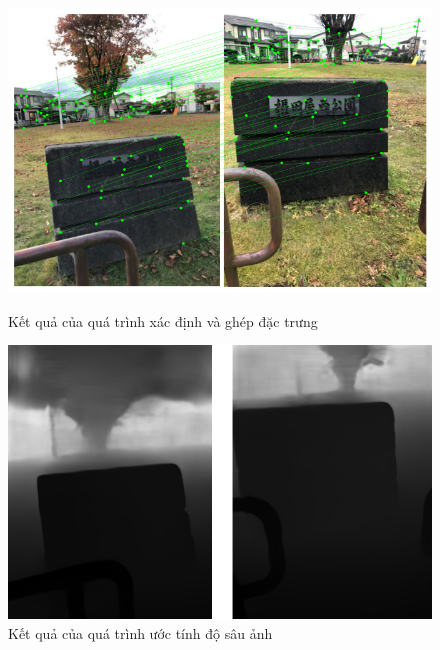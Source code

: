 \begin{figure}[H]
  \centering
  \begin{minipage}[b]{0.48\textwidth}
      \captionsetup{justification=centering}
      \includegraphics[width=\textwidth]{pics/Proposal/matching.png}
      \caption{Kết quả của quá trình xác định và ghép đặc trưng}
  \end{minipage}
  \begin{minipage}[b]{0.48\textwidth}
      \captionsetup{justification=centering}
      \includegraphics[width=\textwidth]{pics/Proposal/depth.png}
      \caption{Kết quả của quá trình ước tính độ sâu ảnh}
  \end{minipage}
\end{figure}

